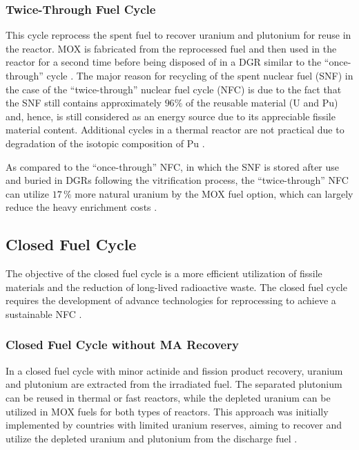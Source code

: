 \subsubsection{Twice-Through Fuel Cycle}

This cycle reprocess the spent fuel to recover uranium and plutonium for reuse in the reactor. MOX is fabricated from the reprocessed fuel and then used in the reactor for a second time before being disposed of in a DGR similar to the ``once-through'' cycle \cite{fuel_cycle_book}. The major reason for recycling of the spent nuclear fuel (SNF) in the case of the “twice-through” nuclear fuel cycle (NFC) is due to the fact that the SNF still contains approximately \(96\%\) of the reusable material (U and Pu) and, hence, is still considered as an energy source due to its appreciable fissile material content. Additional cycles in a thermal reactor are not practical due to degradation of the isotopic composition of Pu \cite{fuel_cycle_book}.

As compared to the “once-through” NFC, in which the SNF is stored after use and buried in DGRs following the vitrification process, the “twice-through” NFC can utilize \(17 \, \%\) more natural uranium by the MOX fuel option, which can largely reduce the heavy enrichment costs \cite{fuel_cycle_book}. 

\subsection{Closed Fuel Cycle}

The objective of the closed fuel cycle is a more efficient utilization of fissile materials and the reduction of long-lived radioactive waste. The closed fuel cycle requires the development of advance technologies for reprocessing to achieve a sustainable NFC \cite{fuel_cycle_book}. 

\subsubsection{Closed Fuel Cycle without MA Recovery}

In a closed fuel cycle with minor actinide and fission product recovery, uranium and plutonium are extracted from the irradiated fuel. The separated plutonium can be reused in thermal or fast reactors, while the depleted uranium can be utilized in MOX fuels for both types of reactors. This approach was initially implemented by countries with limited uranium reserves, aiming to recover and utilize the depleted uranium and plutonium from the discharge fuel \cite{fuel_cycle_book}.


